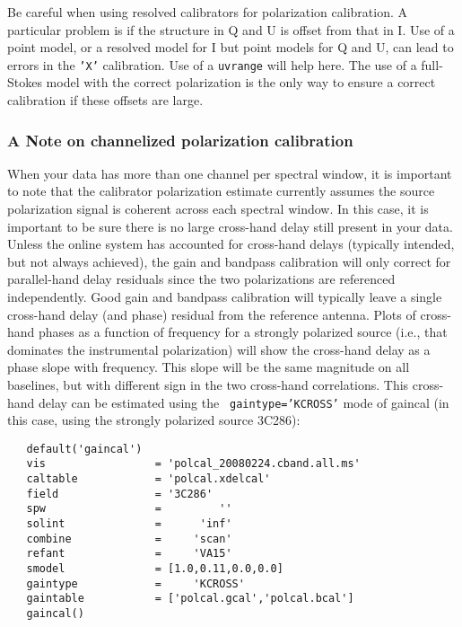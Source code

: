 {Be careful when using resolved calibrators for polarization
calibration.  A particular problem is if the structure in Q and U is
offset from that in I.  Use of a point model, or a resolved model for
I but point models for Q and U, can lead to errors in the {\tt 'X'} 
calibration.  Use of a {\tt uvrange} will help here.  The use of a
full-Stokes model with the correct polarization is the only way to 
ensure a correct calibration if these offsets are large.

\subsubsection{A Note on channelized polarization calibration}

When your data has more than one channel per spectral window, it is
important to note that the calibrator polarization estimate currently
assumes the source polarization signal is coherent across each
spectral window.  In this case, it is important to be sure there is no
large cross-hand delay still present in your data.  Unless the online
system has accounted for cross-hand delays (typically intended, but
not always achieved), the gain and bandpass calibration will only
correct for parallel-hand delay residuals since the two polarizations
are referenced independently.  Good gain and bandpass calibration will
typically leave a single cross-hand delay (and phase) residual from
the reference antenna.  Plots of cross-hand phases as a function of
frequency for a strongly polarized source (i.e., that dominates the
instrumental polarization) will show the cross-hand delay as a phase
slope with frequency.  This slope will be the same magnitude on all
baselines, but with different sign in the two cross-hand correlations.
This cross-hand delay can be estimated using the {\tt
gaintype='KCROSS'} mode of gaincal (in this case, using the strongly
polarized source 3C286):

\small
\begin{verbatim}
   default('gaincal')
   vis                 = 'polcal_20080224.cband.all.ms'
   caltable            = 'polcal.xdelcal'
   field               = '3C286'        
   spw                 =         ''        
   solint              =      'inf'    
   combine             =     'scan' 
   refant              =     'VA15'
   smodel              = [1.0,0.11,0.0,0.0]        
   gaintype            =     'KCROSS'        
   gaintable           = ['polcal.gcal','polcal.bcal']
   gaincal()
\end{verbatim}
\normalsize

}
